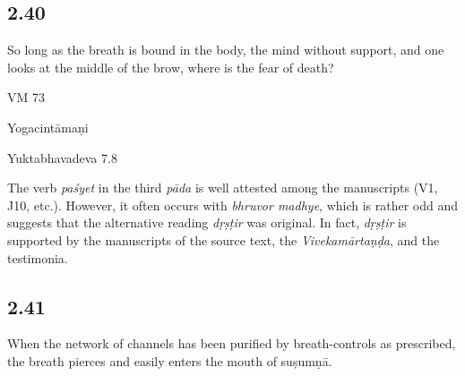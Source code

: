 \begin{ekdosis}
\subsection*{2.40}
\begin{translation}[hp02_040]
So long as the breath is bound in the body, the mind without support, and one looks at the middle of the brow, where is the fear of death?
\end{translation}

\begin{sources}[hp02_040]
VM 73

\begin{versinnote}
\end{versinnote}
\end{sources}

\begin{testimonia}[hp02_040]
Yogacintāmaṇi

\begin{versinnote}
\end{versinnote}
Yuktabhavadeva 7.8

\begin{versinnote}
\end{versinnote}
\end{testimonia}

\begin{philcomm}[hp02_040]
The verb \emph{paśyet} in the third \emph{pāda} is well attested among the manuscripts (V1, J10, etc.). However, it often occurs with \emph{bhruvor madhye}, which is rather odd and suggests that the alternative reading \emph{dṛṣṭir} was original. In fact, \emph{dṛṣṭir} is supported by the manuscripts of the source text, the \emph{Vivekamārtaṇḍa}, and the testimonia. 
\end{philcomm}

\subsection*{2.41}
\begin{translation}[hp02_041]
When the network of channels has been purified by breath-controls as prescribed, the breath pierces and easily enters the mouth of suṣumṇā.
\end{translation}


\end{ekdosis}

